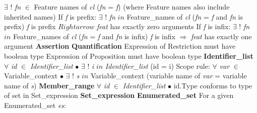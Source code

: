 \indent \indent \indent \indent \indent $\exists$ ! \textit{fn} $\in$ Feature names of \textit{cl} (\textit{fn} = \textit{f}) (where Feature names also include inherited \newline
\indent \indent \indent \indent \indent names)\newline
\indent \indent \indent \indent If \textit{f} is prefix:\newline
\indent \indent \indent \indent \indent $\exists$ ! \textit{fn} $in$ Feature\_names of \textit{cl} (\textit{fn} = \textit{f} and \textit{fn} is prefix)\newline
\indent \indent \indent \indent \indent \textit{f} is prefix $Rightarrow$ \textit{feat} has exactly zero arguments\newline
\indent \indent \indent \indent If \textit{f} is infix:\newline
\indent \indent \indent \indent \indent $\exists$ ! \textit{fn} $in$ Feature\_names of \textit{cl} (\textit{fn} = \textit{f} and \textit{fn} is infix)\newline
\indent \indent \indent \indent \indent \textit{f} is infix $\Rightarrow$ \textit{feat} has exactly one argument\newline
\textbf{Assertion}\newline
\indent \textbf{Quantification}\newline
\indent \indent Expression of Restriction must have boolean type\newline
\indent \indent Expression of Proposition must have boolean type\newline
\textbf{Identifier\_list}\newline
\indent $\forall$ \textit{id} $\in$ \textit{Identifier\_list} $\bullet$ $\exists$ ! \textit{i} $in$ \textit{Identifier\_list} (id = i)\newline
\indent Scope rule:\newline
\indent $\forall$ \textit{var} $\in$ Variable\_context $\bullet$ $\exists$ ! \textit{s} $in$ Variable\_context (variable name of \textit{var} = variable name of \textit{s})\newline
\textbf{Member\_range}\newline
\indent $\forall$ \textit{id} $\in$ \textit{Identifier\_list} $\bullet$ id.Type conforms to type of set in Set\_expression\newline
\indent \textbf{Set\_expression}\newline
\indent \indent \textbf{Enumerated\_set}\newline
\indent \indent \indent For a given Enumerated\_set \textit{es}:\newline
